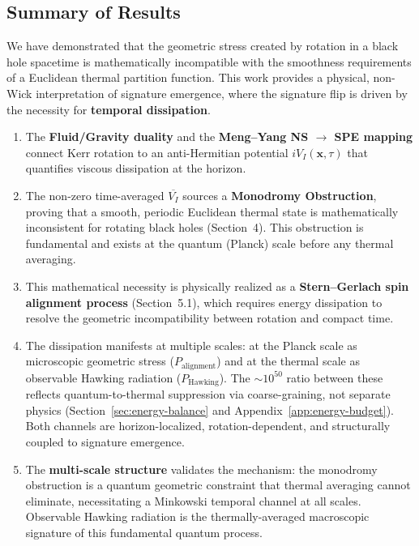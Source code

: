 \documentclass[11pt]{article}
\begin{document}
\subsection{Summary of Results}

We have demonstrated that the geometric stress created by rotation in a black hole 
spacetime is mathematically incompatible with the smoothness requirements of a 
Euclidean thermal partition function. This work provides a physical, non-Wick 
interpretation of signature emergence, where the signature flip is driven by the 
necessity for \textbf{temporal dissipation}.

\begin{enumerate}
\item The \textbf{Fluid/Gravity duality} and the \textbf{Meng--Yang NS $\to$ SPE 
mapping} connect Kerr rotation to an anti-Hermitian potential $iV_I(\mathbf{x}, \tau)$ 
that quantifies viscous dissipation at the horizon.

\item The non-zero time-averaged $\overline{V_I}$ sources a \textbf{Monodromy 
Obstruction}, proving that a smooth, periodic Euclidean thermal state is 
mathematically inconsistent for rotating black holes (Section~4). This obstruction 
is fundamental and exists at the quantum (Planck) scale before any thermal averaging.

\item This mathematical necessity is physically realized as a \textbf{Stern--Gerlach 
spin alignment process} (Section~5.1), which requires energy dissipation to resolve 
the geometric incompatibility between rotation and compact time.

\item The dissipation manifests at multiple scales: at the Planck scale as microscopic 
geometric stress ($P_{\text{alignment}}$) and at the thermal scale as observable 
Hawking radiation ($P_{\text{Hawking}}$). The $\sim 10^{50}$ ratio between these 
reflects quantum-to-thermal suppression via coarse-graining, not separate physics 
(Section~\ref{sec:energy-balance} and Appendix~\ref{app:energy-budget}). Both channels 
are horizon-localized, rotation-dependent, and structurally coupled to signature 
emergence.

\item The \textbf{multi-scale structure} validates the mechanism: the monodromy 
obstruction is a quantum geometric constraint that thermal averaging cannot eliminate, 
necessitating a Minkowski temporal channel at all scales. Observable Hawking radiation 
is the thermally-averaged macroscopic signature of this fundamental quantum process.
\end{enumerate}
\end{document}
